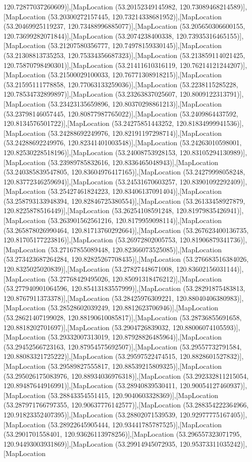 120.72877037260609)],[MapLocation (53.20152349145982, 120.73089468214589)],[MapLocation (53.20300272157445, 120.73214338681952)],[MapLocation (53.20469925119237, 120.73488996885077)],[MapLocation (53.205650306600155, 120.73699282071844)],[MapLocation (53.2074238400338, 120.73935316465155)],[MapLocation (53.21207580356777, 120.74978159330145)],[MapLocation (53.21308813735253, 120.75334356687323)],[MapLocation (53.213859114021425, 120.75870798490301)],[MapLocation (53.21411610316119, 120.76214121244207)],[MapLocation (53.21500029100033, 120.76771308918215)],[MapLocation (53.21595111778858, 120.77063133259036)],[MapLocation (53.2238115285228, 120.78534732899897)],[MapLocation (53.23263837025607, 120.8009122313791)],[MapLocation (53.23423135659896, 120.80370298861213)],[MapLocation (53.23798146057445, 120.80877987765022)],[MapLocation (53.2409864437592, 120.8134576501722)],[MapLocation (53.24275851443252, 120.81834999941536)],[MapLocation (53.24288692249976, 120.82191197298714)],[MapLocation (53.24288692249976, 120.82341401003548)],[MapLocation (53.24263010598001, 120.82530228518196)],[MapLocation (53.24008753928153, 120.83105294130989)],[MapLocation (53.23989785832616, 120.8336465048943)],[MapLocation (53.240385839547805, 120.83604976417165)],[MapLocation (53.24279998058248, 120.83772346259694)],[MapLocation (53.24531670603257, 120.83901092292409)],[MapLocation (53.25427461824223, 120.83406137091404)],[MapLocation (53.258793133948394, 120.82846725380554)],[MapLocation (53.26133458927879, 120.8225878516449)],[MapLocation (53.26254108591248, 120.81979835426941)],[MapLocation (53.263901562561216, 120.8179959098114)],[MapLocation (53.265878026990464, 120.81713760292664)],[MapLocation (53.267623400136735, 120.81705177223816)],[MapLocation (53.26972802005753, 120.81906879341736)],[MapLocation (53.27167855089448, 120.82366073525085)],[MapLocation (53.273423687264284, 120.82825267708435)],[MapLocation (53.276683516384026, 120.8325025020839)],[MapLocation (53.27827448671008, 120.83602156031144)],[MapLocation (53.27768429495026, 120.85091318476212)],[MapLocation (53.277940901064596, 120.85413183557999)],[MapLocation (53.28291875483813, 120.8767911373378)],[MapLocation (53.28425976309221, 120.88040406380983)],[MapLocation (53.28528602039249, 120.8812623706946)],[MapLocation (53.28621407199028, 120.88190610085817)],[MapLocation (53.28736855691658, 120.8818202701697)],[MapLocation (53.2904726839032, 120.88006074105593)],[MapLocation (53.29332007313019, 120.87928826485964)],[MapLocation (53.29452566723163, 120.87954575692507)],[MapLocation (53.29557732791584, 120.88083321725222)],[MapLocation (53.29597522474515, 120.8828601527832)],[MapLocation (53.29589827555817, 120.88539215809325)],[MapLocation (53.295026175083976, 120.88934036976318)],[MapLocation (53.292332811215054, 120.89487644916991)],[MapLocation (53.28940839530411, 120.90054127460937)],[MapLocation (53.28843354551415, 120.9040603328369)],[MapLocation (53.287971766797355, 120.90637776142577)],[MapLocation (53.288354222364966, 120.91823352407395)],[MapLocation (53.28802071539539, 120.92977775167405)],[MapLocation (53.28922645905444, 120.93441785787525)],[MapLocation (53.2901701558401, 120.93626113978256)],[MapLocation (53.296557323071795, 120.94493003931869)],[MapLocation (53.29914945072935, 120.95373311035242)],[MapLocation 